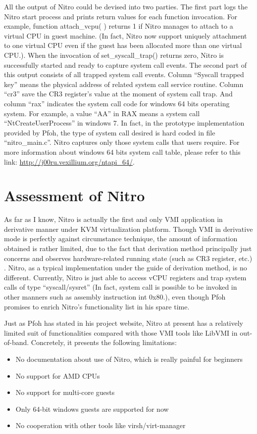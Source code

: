 All the output of Nitro could be devised into two parties. 
The first part logs the Nitro start process and prints return values for each function invocation. 
For example, function attach\_vcpu( ) returns 1 if Nitro manages to attach to a virtual CPU in guest machine.
(In fact, Nitro now support uniquely attachment to one virtual CPU even if the guest has been allocated more than one virtual CPU.). 
When the invocation of set\_syscall\_trap() returns zero, Nitro is successfully started and ready to capture system call events.
The second part of this output consists of all trapped system call events. Column “Syscall trapped key” means the physical address of 
related system call service routine. Column “cr3” save the CR3 register’s value at the moment of system call trap. And column “rax” 
indicates the system call code for windows 64 bits operating system. For example, a value “AA” in RAX means a system call 
“NtCreateUserProcess” in windows 7. In fact, in the prototype implementation provided by Pfoh, the type of system call desired is 
hard coded in file “nitro\_main.c”. Nitro captures only those system calls that users require.  
For more information about windows 64 bits system call table, please refer to this link: \url{http://j00ru.vexillium.org/ntapi\_64/}.

\section{Assessment of Nitro}
As far as I know, Nitro is actually the first and only VMI application in derivative manner under KVM virtualization platform. 
Though VMI in derivative mode is perfectly against circumstance technique, the amount of information obtained is rather limited, 
due to the fact that derivation method principally just concerns and observes hardware-related running state (such as CR3 register, etc.)
\cite{Reference17}. Nitro, as a typical implementation under the guide of derivation method, is no different. Currently, Nitro is just able to access vCPU 
registers and trap system calls of type “syscall/sysret” (In fact, system call is possible to be invoked in other manners such as assembly instruction int 
0x80.), even though Pfoh promises to enrich Nitro’s functionality list in his spare time.

Just as Pfoh has stated in his project website, Nitro at present has a relatively limited suit of functionalities compared with 
those VMI tools like LibVMI in out-of-band. Concretely, it presents the following limitations:
\begin{itemize}
    \item No documentation about use of Nitro, which is really painful for beginners
    \item No support for AMD CPUs
    \item No support for multi-core guests
    \item Only 64-bit windows guests are supported for now
    \item No cooperation with other tools like virsh/virt-manager
\end{itemize}

